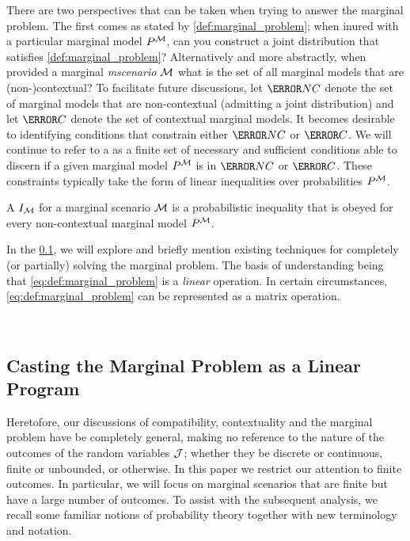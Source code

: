 \documentclass[aps, 10pt, english, twoside, pra, nofootinbib, longbibliography]{revtex4-1}
\begin{document}
    There are two perspectives that can be taken when trying to answer the marginal problem. The first comes as stated by \cref{def:marginal_problem}; when inured with a particular marginal model $\prob^{\mscenario}$, can you construct a joint distribution that satisfies \cref{def:marginal_problem}? Alternatively and more abstractly, when provided a marginal \textit{mscenario} $\mathcal{M}$ what is the set of all marginal models that are (non-)contextual? To facilitate future discussions, let $\s{NC}$ denote the set of marginal models that are non-contextual (admitting a joint distribution) and let $\s{C}$ denote the set of contextual marginal models. It becomes desirable to identifying conditions that constrain either $\s{NC}$ or $\s{C}$. We will continue to refer to a  as a finite set of necessary and sufficient conditions able to discern if a given marginal model $\prob^{\mscenario}$ is in $\s{NC}$ or $\s{C}$. These constraints typically take the form of linear inequalities over probabilities $\prob^{\mscenario}$.

    \begin{definition}
        A  $I_{\mathcal{M}}$ for a marginal scenario $\mathcal{M}$ is a probabilistic inequality that is obeyed for every non-contextual marginal model $\prob^{\mscenario}$.
    \end{definition}

    In the \cref{sec:linear_program}, we will explore and briefly mention existing techniques for completely (or partially) solving the marginal problem. The basis of understanding being that \cref{eq:def:marginal_problem} is a \textit{linear} operation. In certain circumstances, \cref{eq:def:marginal_problem} can be represented as a matrix operation.

     \\

    \subsection{Casting the Marginal Problem as a Linear Program}
    \label{sec:linear_program}

    Heretofore, our discussions of compatibility, contextuality and the marginal problem have be completely general, making no reference to the nature of the outcomes of the random variables $\mathcal{J}$; whether they be discrete or continuous, finite or unbounded, or otherwise.  In this paper we restrict our attention to finite outcomes. In particular, we will focus on marginal scenarios that are finite but have a large number of outcomes. To assist with the subsequent analysis, we recall some familiar notions of probability theory together with new terminology and notation. \\
\end{document}

